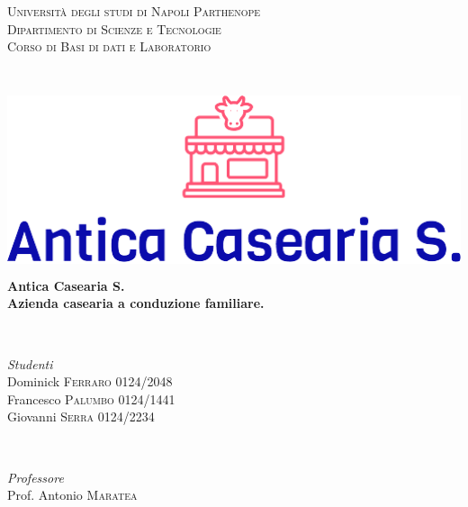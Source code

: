 \documentclass[12pt]{report}
\begin{document}
\begin{titlepage}
\begin{center}

\textsc{
	\LARGE Università degli studi di Napoli Parthenope\\
	\Large Dipartimento di Scienze e Tecnologie\\[2.5mm]
	\large Corso di Basi di dati e Laboratorio
}

\hrulefill \\[35.0mm]

\includegraphics[height=55mm]{imgs/logo.png} \\[20mm]

\Huge\textbf{Antica Casearia S.}\\
\large\textbf{Azienda casearia a conduzione familiare.}\\

\vfill

\hrulefill \\[3.0mm]

\begin{minipage}{0.4\textwidth}
	\begin{flushleft}
		\large
		\textit{Studenti}\\
		Dominick  \textsc{Ferraro} 0124/2048 \\
		Francesco \textsc{Palumbo} 0124/1441\\
		Giovanni \textsc{Serra} 0124/2234
	\end{flushleft}
\end{minipage}
~
\begin{minipage}{0.4\textwidth}
	\begin{flushright}
		\large
		\textit{Professore}\\
		Prof. Antonio \textsc{Maratea} %
	\end{flushright}
\end{minipage} \\[3.0mm]


\end{center}
\end{titlepage}
\end{document}
